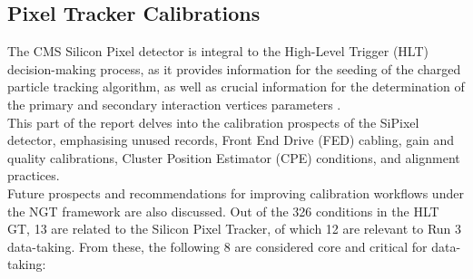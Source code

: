 \subsection{Pixel Tracker Calibrations}\label{sec:PixelCalib}

The CMS Silicon Pixel detector is integral to the High-Level Trigger (HLT) decision-making process, as it provides information for the seeding of the charged particle tracking algorithm, as well as crucial information for the determination of the primary and secondary interaction vertices parameters \cite{Dominguez:1481838,Adam_2021}.\\
This part of the report delves into the calibration prospects of the SiPixel detector, emphasising unused records, Front End Drive (FED) cabling, gain and quality calibrations, Cluster Position Estimator (CPE) conditions, and alignment practices.\\
Future prospects and recommendations for improving calibration workflows under the NGT framework are also discussed.\newline \newline 
Out of the 326 conditions in the HLT GT, 13 are related to the Silicon Pixel Tracker, of which 12 are relevant to Run 3 data-taking. From these, the following 8 are considered core and critical for data-taking:

